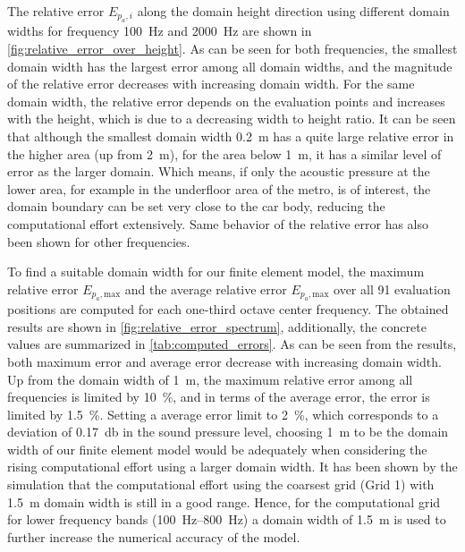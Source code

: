 {The relative error $E_{p_a,i}$ along the domain height direction using different domain widths for frequency \SI{100}{\hertz} and \SI{2000}{\hertz} are shown in \cref{fig:relative_error_over_height}. As can be seen for both frequencies, the smallest domain width has the largest error among all domain widths, and the magnitude of the relative error decreases with increasing domain width. For the same domain width, the relative error depends on the evaluation points and increases with the height, which is due to a decreasing width to height ratio. It can be seen that although the smallest domain width \SI{0.2}{\meter} has a quite large relative error in the higher area (up from \SI{2}{\meter}), for the area below \SI{1}{\meter}, it has a similar level of error as the larger domain. Which means, if only the acoustic pressure at the lower area, for example in the underfloor area of the metro, is of interest, the domain boundary can be set very close to the car body, reducing the computational effort extensively. Same behavior of the relative error has also been shown for other frequencies.

To find a suitable domain width for our finite element model, the maximum relative error $E_{p_a,\text{max}}$ and the average relative error $E_{p_a,\text{max}}$ over all 91 evaluation positions are computed for each one-third octave center frequency. The obtained results are shown in \cref{fig:relative_error_spectrum}, additionally, the concrete values are summarized in \cref{tab:computed_errors}. As can be seen from the results, both maximum error and average error decrease with increasing domain width. Up from the domain width of \SI{1}{\meter}, the maximum relative error among all frequencies is limited by \SI{10}{\percent}, and in terms of the average error, the error is limited by \SI{1.5}{\percent}. Setting a average error limit to \SI{2}{\percent}, which corresponds to a deviation of \SI{0.17}{\decibel} in the sound pressure level, choosing \SI{1}{\meter} to be the domain width of our finite element model would be adequately when considering the rising computational effort using a larger domain width. It has been shown by the simulation that the computational effort using the coarsest grid (Grid 1) with \SI{1.5}{\meter} domain width is still in a good range. Hence, for the computational grid for lower frequency bands (\SIrange{100}{800}{\hertz}) a domain width of \SI{1.5}{\meter} is used to further increase the numerical accuracy of the model.

}
